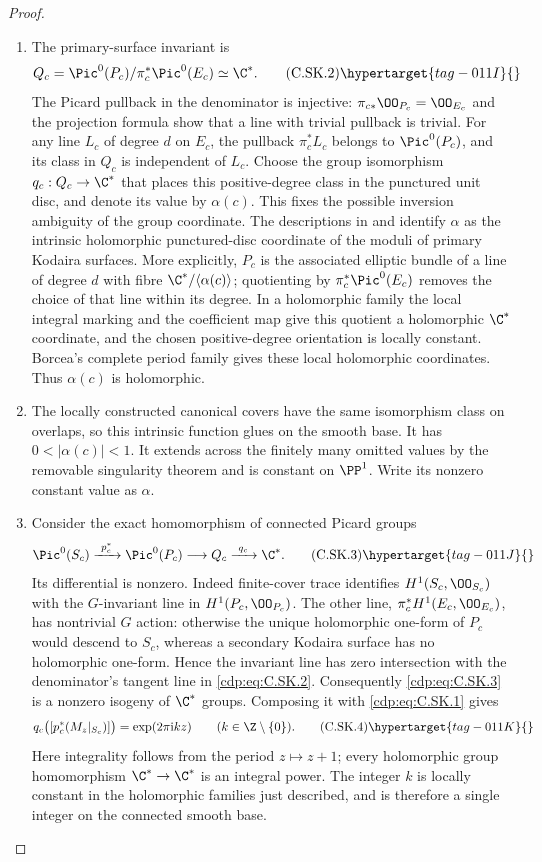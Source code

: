 \begin{proof}
\begin{enumerate}[label=\arabic*.,leftmargin=*]
\item The primary-surface invariant is
\[
 Q_c=\Pic^0(P_c)/\pi_c^*\Pic^0(E_c)\simeq\C^*.
\tag{C.SK.2}\hypertarget{tag-011I}{}\label{cdp:eq:C.SK.2}
\]
The Picard pullback in the denominator is injective:
$\pi_{c*}\OO_{P_c}=\OO_{E_c}$ and the projection formula
show that a line with trivial pullback is trivial. For
any line $L_c$ of degree $d$ on $E_c$, the pullback
$\pi_c^*L_c$ belongs to $\Pic^0(P_c)$, and its class in
$Q_c$ is independent of $L_c$. Choose the group
isomorphism $q_c:Q_c\to\C^*$ that places this
positive-degree class in the punctured unit disc, and
denote its value by $\alpha(c)$.
This fixes the possible inversion ambiguity of the
group coordinate. The descriptions in
\cite[Theorem~4 and Remark~1, pp.~377, 380]{Borcea1984} and
\cite[\S1, pp.~2--3]{SS2002} identify $\alpha$ as the
intrinsic holomorphic punctured-disc coordinate of the
moduli of primary Kodaira surfaces. More explicitly,
$P_c$ is the associated elliptic bundle of a line of
degree $d$ with fibre $\C^*/\langle\alpha(c)\rangle$;
quotienting by $\pi_c^*\Pic^0(E_c)$ removes the choice
of that line within its degree. In a holomorphic
family the local integral marking and the coefficient
map give this quotient a holomorphic $\C^*$ coordinate,
and the chosen positive-degree orientation is locally
constant. Borcea's complete period family gives these local holomorphic
coordinates. Thus $\alpha(c)$ is holomorphic.

\item The locally constructed canonical covers have the same
isomorphism class on overlaps, so this intrinsic
function glues on the smooth base. It has
$0<|\alpha(c)|<1$. It extends across the finitely many
omitted values by the removable singularity theorem
and is constant on $\PP^1$. Write its nonzero constant
value as $\alpha$.

\item Consider the exact homomorphism of connected Picard
groups
\[
 \Pic^0(S_c)\xrightarrow{\ p_c^*\ }\Pic^0(P_c)
          \longrightarrow Q_c\xrightarrow{\ q_c\ }\C^*.
\tag{C.SK.3}\hypertarget{tag-011J}{}\label{cdp:eq:C.SK.3}
\]
Its differential is nonzero. Indeed finite-cover trace
identifies $H^1(S_c,\OO_{S_c})$ with the $G$-invariant
line in $H^1(P_c,\OO_{P_c})$. The other line,
$\pi_c^*H^1(E_c,\OO_{E_c})$, has nontrivial $G$ action:
otherwise the unique holomorphic one-form of $P_c$
would descend to $S_c$, whereas a secondary Kodaira
surface has no holomorphic one-form. Hence the invariant
line has zero intersection with the denominator's
tangent line in \eqref{cdp:eq:C.SK.2}.
Consequently \eqref{cdp:eq:C.SK.3} is a nonzero isogeny of $\C^*$
groups. Composing it with \eqref{cdp:eq:C.SK.1} gives
\[
 q_c\bigl([p_c^*(M_z|_{S_c})]\bigr)
       =\exp(2\pi\mathrm i k z)
       \qquad(k\in\Z\setminus\{0\}).
\tag{C.SK.4}\hypertarget{tag-011K}{}\label{cdp:eq:C.SK.4}
\]
Here integrality follows from the period $z\mapsto z+1$;
every holomorphic group homomorphism $\C^*\to\C^*$ is
an integral power. The integer $k$ is locally constant
in the holomorphic families just described, and is
therefore a single integer on the connected smooth base.


\end{enumerate}
\end{proof}
